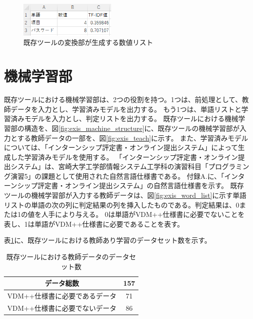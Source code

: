 \begin{figure}[tp]
    \begin{center}
        \includegraphics[width=180]{image/exis_suti_list.png}
        \caption{既存ツールの変換部が生成する数値リスト}
        \label{fig:exis_suti_list}
    \end{center}
\end{figure}

\section{機械学習部}
\label{sec:exis_machine}
既存ツールにおける機械学習部は、2つの役割を持つ。1つは、前処理として、教師データを入力とし、学習済みモデルを出力する。
もう1つは、単語リストと学習済みモデルを入力とし、判定リストを出力する。
既存ツールにおける機械学習部の構造を、図\ref{fig:exis_machine_structure}に、既存ツールの機械学習部が入力とする教師データの一部を、図\ref{fig:exis_teach}に示す。
また、学習済みモデルについては、「インターンシップ評定書・オンライン提出システム」によって生成した学習済みモデルを使用する。
「インターンシップ評定書・オンライン提出システム」は、宮崎大学工学部情報システム工学科の演習科目「プログラミング演習5」の課題として使用された自然言語仕様書である。
付録A.に、「インターンシップ評定書・オンライン提出システム」の自然言語仕様書を示す。
既存ツールの機械学習部が入力する教師データは、図\ref{fig:exis_word_list}に示す単語リストの単語の次の列に判定結果の列を挿入したものである。判定結果は、0または1の値を人手により与える。
0は単語がVDM++仕様書に必要でないことを表し、1は単語がVDM++仕様書に必要であることを表す。

表\ref{table:exis_data_set}に、既存ツールにおける教師あり学習のデータセット数を示す。

\begin{table}[t]
    \begin{center}
      \caption{既存ツールにおける教師データのデータセット数}
      \label{table:exis_data_set}
      \begin{tabular}{c|c}
        データ総数　& 157\\
        \hline
        \hline
        VDM++仕様書に必要であるデータ    & 71\\ \hline
        VDM++仕様書に必要でないデータ & 86\\ \hline
      \end{tabular}
    \end{center}
  \end{table}

